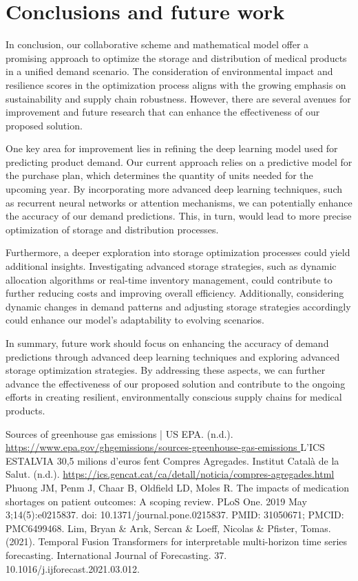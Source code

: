\documentclass[11pt,twocolumn]{article}
\begin{document}
\section{Conclusions and future work}

In conclusion, our collaborative scheme and mathematical model offer a promising approach to optimize the storage and distribution of medical products in a unified demand scenario. The consideration of environmental impact and resilience scores in the optimization process aligns with the growing emphasis on sustainability and supply chain robustness. However, there are several avenues for improvement and future research that can enhance the effectiveness of our proposed solution.

One key area for improvement lies in refining the deep learning model used for predicting product demand. Our current approach relies on a predictive model for the purchase plan, which determines the quantity of units needed for the upcoming year. By incorporating more advanced deep learning techniques, such as recurrent neural networks or attention mechanisms, we can potentially enhance the accuracy of our demand predictions. This, in turn, would lead to more precise optimization of storage and distribution processes.

Furthermore, a deeper exploration into storage optimization processes could yield additional insights. Investigating advanced storage strategies, such as dynamic allocation algorithms or real-time inventory management, could contribute to further reducing costs and improving overall efficiency. Additionally, considering dynamic changes in demand patterns and adjusting storage strategies accordingly could enhance our model's adaptability to evolving scenarios.

In summary, future work should focus on enhancing the accuracy of demand predictions through advanced deep learning techniques and exploring advanced storage optimization strategies. By addressing these aspects, we can further advance the effectiveness of our proposed solution and contribute to the ongoing efforts in creating resilient, environmentally conscious supply chains for medical products.

\begin{thebibliography}{}
	 Sources of greenhouse gas emissions | US EPA. (n.d.). \url{https://www.epa.gov/ghgemissions/sources-greenhouse-gas-emissions }
	 L’ICS ESTALVIA 30,5 milions d’euros fent Compres Agregades. Institut Català de la Salut. (n.d.). \url{https://ics.gencat.cat/ca/detall/noticia/compres-agregades.html}
	 Phuong JM, Penm J, Chaar B, Oldfield LD, Moles R. The impacts of medication shortages on patient outcomes: A scoping review. PLoS One. 2019 May 3;14(5):e0215837. doi: 10.1371/journal.pone.0215837. PMID: 31050671; PMCID: PMC6499468.
	 Lim, Bryan \& Arık, Sercan \& Loeff, Nicolas \& Pfister, Tomas. (2021). Temporal Fusion Transformers for interpretable multi-horizon time series forecasting. International Journal of Forecasting. 37. 10.1016/j.ijforecast.2021.03.012.
\end{thebibliography}
\end{document}
